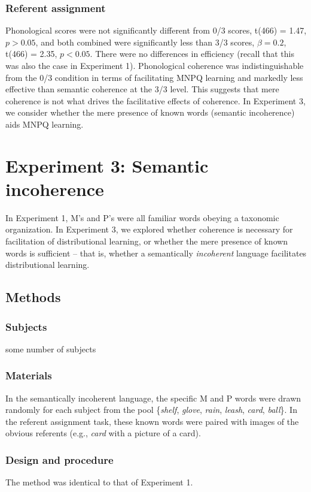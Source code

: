 \documentclass[man,floatsintext]{apa6}
\begin{document}
\subsubsection{Referent assignment}
Phonological scores were not significantly different from 0/3 scores, t(466) = 1.47, $p > 0.05$, and both combined were significantly less than 3/3 scores, $\beta = 0.2$, t(466) = 2.35, $p < 0.05$. There were no differences in efficiency (recall that this was also the case in Experiment 1). Phonological coherence was indistinguishable from the 0/3 condition in terms of facilitating MNPQ learning and markedly less effective than semantic coherence at the 3/3 level. This suggests that mere coherence is not what drives the facilitative effects of coherence. In Experiment 3, we consider whether the mere presence of known words (semantic incoherence) aids MNPQ learning.

\section{Experiment 3: Semantic incoherence}

In Experiment 1, M's and P's were all familiar words obeying a taxonomic organization. In Experiment 3, we explored whether coherence is necessary for facilitation of distributional learning, or whether the mere presence of known words is sufficient -- that is, whether a semantically \emph{incoherent} language facilitates distributional learning.

\subsection{Methods}
\subsubsection{Subjects}
some number of subjects

\subsubsection{Materials}
In the semantically incoherent language, the specific M and P words were drawn randomly for each subject from the pool \{\emph{shelf}, \emph{glove}, \emph{rain}, \emph{leash}, \emph{card}, \emph{ball}\}. In the referent assignment task, these known words were paired with images of the obvious referents (e.g., \emph{card} with a picture of a card).

\subsubsection{Design and procedure}  The method was identical to that of Experiment 1.
\end{document}
